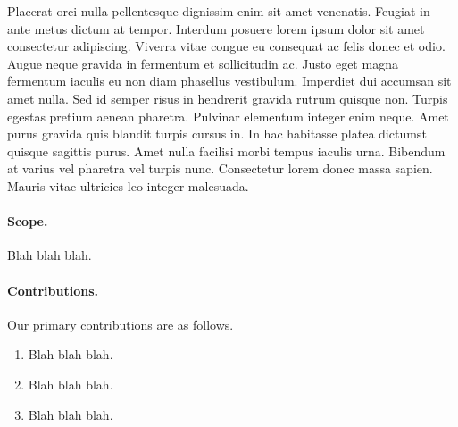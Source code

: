 Placerat orci nulla pellentesque dignissim enim sit amet venenatis. Feugiat in ante metus dictum at tempor. Interdum posuere lorem ipsum dolor sit amet consectetur adipiscing. Viverra vitae congue eu consequat ac felis donec et odio. Augue neque gravida in fermentum et sollicitudin ac. Justo eget magna fermentum iaculis eu non diam phasellus vestibulum. Imperdiet dui accumsan sit amet nulla. Sed id semper risus in hendrerit gravida rutrum quisque non. Turpis egestas pretium aenean pharetra. Pulvinar elementum integer enim neque. Amet purus gravida quis blandit turpis cursus in. In hac habitasse platea dictumst quisque sagittis purus. Amet nulla facilisi morbi tempus iaculis urna. Bibendum at varius vel pharetra vel turpis nunc. Consectetur lorem donec massa sapien. Mauris vitae ultricies leo integer malesuada.

 

\paragraph{Scope.} 
Blah blah blah.


\paragraph{Contributions.} 
Our primary contributions are as follows.

\begin{enumerate}

\item Blah blah blah.

\item Blah blah blah. 

\item Blah blah blah. 

\end{enumerate}

